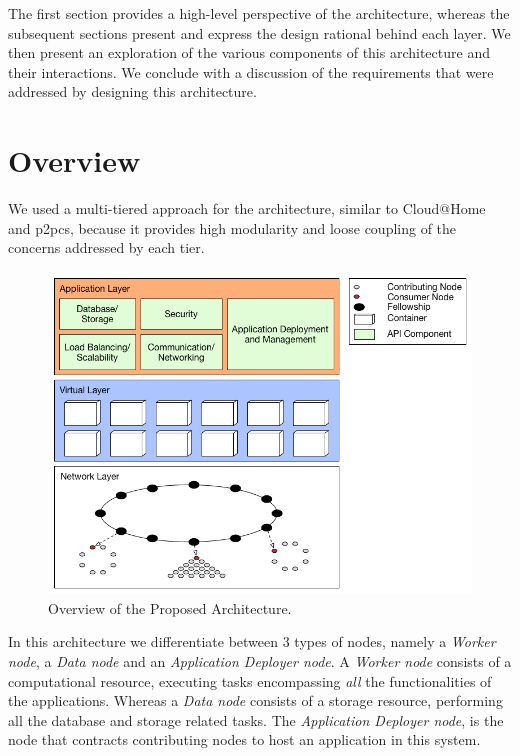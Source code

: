\documentclass[12pt, titlepage]{uo_temp}
\begin{document}
     The first section provides a high-level perspective of the architecture, whereas the
     subsequent sections present and express the design rational behind each layer. We
     then present an exploration of the various components of this architecture and their
     interactions. We conclude with a discussion of the requirements that were addressed
     by designing this architecture.

     \section{Overview}\label{arch_over}
     We used a multi-tiered approach for the architecture, similar to Cloud@Home and
     \gls{p2pcs}, because it provides high modularity and loose coupling of the concerns
     addressed by each tier.
     \begin{figure}[h]
       \centering
       \includegraphics[width=125mm]{images/overview_arch.png}
       \caption{Overview of the Proposed Architecture.}
     \end{figure}
     In this architecture we differentiate between 3 types of nodes, namely a \emph{Worker
       node}, a \emph{Data node} and an \emph{Application Deployer node}. A \emph{Worker
       node} consists of a computational resource, executing tasks encompassing \emph{all}
     the functionalities of the applications. Whereas a \emph{Data node} consists of a
     storage resource, performing all the database and storage related tasks. The
     \emph{Application Deployer node}, is the node that contracts contributing nodes to
     host an application in this system.
\end{document}
